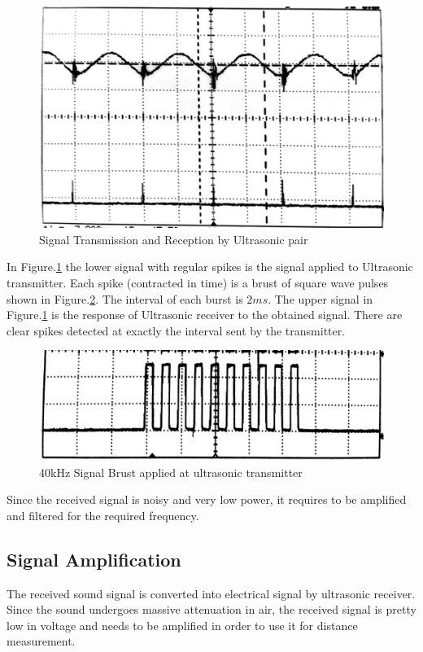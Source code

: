 \begin{figure}
	\centering
	\includegraphics[width=120mm]{Images/UltrasonicTransception.jpg}
	\caption{Signal Transmission and Reception by Ultrasonic pair}
	\label{fig:UltrasonicTransception}
\end{figure}
In Figure.\ref{fig:UltrasonicTransception} the lower signal with regular spikes is the signal applied to Ultrasonic transmitter. Each spike (contracted in time) is a brust of square wave pulses shown in Figure.\ref{fig:SignalBrust}. The interval of each burst is $2ms$. The upper signal in Figure.\ref{fig:UltrasonicTransception} is the response of Ultrasonic receiver to the obtained signal. There are clear spikes  detected at exactly the interval sent by the transmitter.
\begin{figure}
	\centering
	\includegraphics[width=120mm]{Images/SignalBrust.jpg}
	\caption{40kHz Signal Brust applied at ultrasonic transmitter}
	\label{fig:SignalBrust}
\end{figure}
 
Since the received signal is noisy and very low power, it requires to be amplified and filtered for the required frequency.
\subsection{Signal Amplification}

The received sound signal is converted into electrical signal by ultrasonic receiver. Since the sound undergoes massive attenuation in air, the received signal is pretty low in voltage and needs to be amplified in order to use it for distance measurement. 

